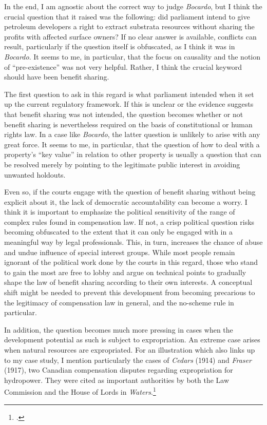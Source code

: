 In the end, I am agnostic about the correct way to judge {\it Bocardo}, but I think the crucial question that it raised was the following: did parliament intend to give petroleum developers a right to extract substrata resources without sharing the profits with affected surface owners? If no clear answer is available, conflicts can result, particularly if the question itself is obfuscated, as I think it was in {\it Bocardo}. It seems to me, in particular, that the focus on causality and the notion of ``pre-existence'' was not very helpful. Rather, I think the crucial keyword should have been benefit sharing.

The first question to ask in this regard is what parliament intended when it set up the current regulatory framework. If this is unclear or the evidence suggests that benefit sharing was not intended, the question becomes whether or not benefit sharing is nevertheless required on the basis of constitutional or human rights law. In a case like {\it Bocardo}, the latter question is unlikely to arise with any great force. It seems to me, in particular, that the question of how to deal with a property's ``key value'' in relation to other property is usually a question that can be resolved merely by pointing to the legitimate public interest in avoiding unwanted holdouts.

Even so, if the courts engage with the question of benefit sharing without being explicit about it, the lack of democratic accountability can become a worry. I think it is important to emphasize the political sensitivity of the range of complex rules found in compensation law. If not, a crisp political question risks becoming obfuscated to the extent that it can only be engaged with in a meaningful way by legal professionals. This, in turn, increases the chance of abuse and undue influence of special interest groups. While most people remain ignorant of the political work done by the courts in this regard, those who stand to gain the most are free to lobby and argue on technical points to gradually shape the law of benefit sharing according to their own interests. A conceptual shift might be needed to prevent this development from becoming precarious to the legitimacy of compensation law in general, and the no-scheme rule in particular. 

In addition, the question becomes much more pressing in cases when the development potential as such is subject to expropriation. An extreme case arises when natural resources are expropriated. For an illustration which also links up to my case study, I mention particularly the cases of \emph{Cedars} (1914) and \emph{Fraser} (1917), two Canadian compensation disputes regarding expropriation for hydropower. They were cited as important authorities by both the Law Commission and the House of Lords in \emph{Waters}.\footnote{\cite{cedars14,fraser17}.} 

